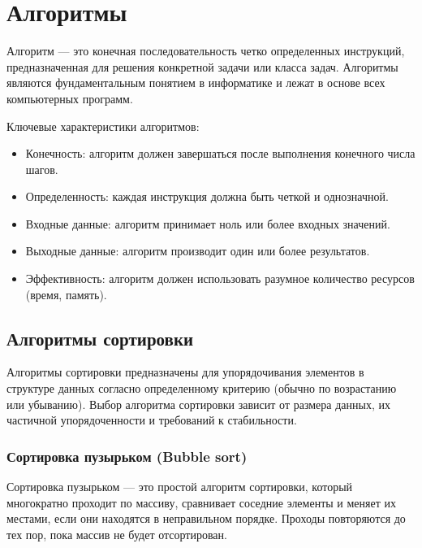 \documentclass[a4paper,12pt]{article}
\begin{document}
\section{Алгоритмы}
\label{sec:универсальные-алгоритмы}

Алгоритм --- это конечная последовательность четко определенных инструкций, предназначенная для решения конкретной задачи или класса задач. Алгоритмы являются фундаментальным понятием в информатике и лежат в основе всех компьютерных программ.

Ключевые характеристики алгоритмов:

\begin{itemize}
    \item Конечность: алгоритм должен завершаться после выполнения конечного числа шагов.
    \item Определенность: каждая инструкция должна быть четкой и однозначной.
    \item Входные данные: алгоритм принимает ноль или более входных значений.
    \item Выходные данные: алгоритм производит один или более результатов.
    \item Эффективность: алгоритм должен использовать разумное количество ресурсов (время, память).
\end{itemize}

\subsection{Алгоритмы сортировки}
\label{subsec:алгоритмы-сортировки}

Алгоритмы сортировки предназначены для упорядочивания элементов в структуре данных согласно определенному критерию (обычно по возрастанию или убыванию). Выбор алгоритма сортировки зависит от размера данных, их частичной упорядоченности и требований к стабильности.

\subsubsection{Сортировка пузырьком (Bubble sort)}
\label{subsubsec:сортировка-пузырьком-bubble-sort}

Сортировка пузырьком --- это простой алгоритм сортировки, который многократно проходит по массиву, сравнивает соседние элементы и меняет их местами, если они находятся в неправильном порядке. Проходы повторяются до тех пор, пока массив не будет отсортирован.
\end{document}
